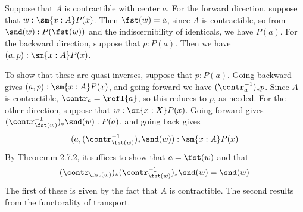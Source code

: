  \soln
Suppose that $A$ is contractible with center $a$.  For the forward direction,
suppose that $w : \sm{x:A} P(x)$.  Then $\fst(w) = a$, since $A$ is
contractible, so from $\snd(w) : P(\fst(w))$ and the indiscernibility
of identicals, we have $P(a)$.  For the backward direction, suppose
that $p : P(a)$.  Then we have $(a, p) : \sm{x:A} P(x)$.


To show that these are quasi-inverses, suppose that $p : P(a)$.  Going backward
gives $(a, p) : \sm{x:A} P(x)$, and going forward we have
$(\contr_{a}^{-1})_{*}p$.  Since $A$ is contractible, $\contr_{a} =
\refl{a}$, so this reduces to $p$, as needed.
For the other direction, suppose that $w : \sm{x:X} P(x)$.  Going forward gives
$(\contr_{\fst(w)}^{-1})_{*}\snd(w) : P(a)$, and going back gives
\[
  (a, (\contr_{\fst(w)}^{-1})_{*}\snd(w)) : \sm{x:A} P(x)
\]
By Theoremm 2.7.2, it suffices to show that $a = \fst(w)$ and that
\[
  (\contr_{\fst(w)})_{*}(\contr_{\fst(w)}^{-1})_{*} \snd(w) = \snd(w)
\]
The first of these is given by the fact that $A$ is contractible.  The second
results from the functorality of transport.
